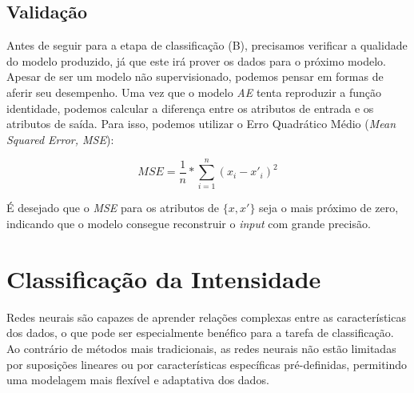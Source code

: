 \subsection{Validação}

Antes de seguir para a etapa de classificação (B), precisamos verificar a qualidade do modelo produzido, já que este irá prover os dados para o próximo modelo. Apesar de ser um modelo não supervisionado, podemos pensar em formas de aferir seu desempenho. Uma vez que o modelo \textit{AE} tenta reproduzir a função identidade, podemos calcular a diferença entre os atributos de entrada e os atributos de saída. Para isso, podemos utilizar o Erro Quadrático Médio (\textit{Mean Squared Error, MSE}):

\begin{equation}
    MSE = \frac{1}{n} * \sum^n_{i=1} (x_i - x'_i)^2
\end{equation}

É desejado que o \textit{MSE} para os atributos de $\{x, x'\}$ seja o mais próximo de zero, indicando que o modelo consegue reconstruir o \textit{input} com grande precisão.


\section{Classificação da Intensidade}




Redes neurais são capazes de aprender relações complexas entre as características dos dados, o que pode ser especialmente benéfico para a tarefa de classificação. Ao contrário de métodos mais tradicionais, as redes neurais não estão limitadas por suposições lineares ou por características específicas pré-definidas, permitindo uma modelagem mais flexível e adaptativa dos dados.

